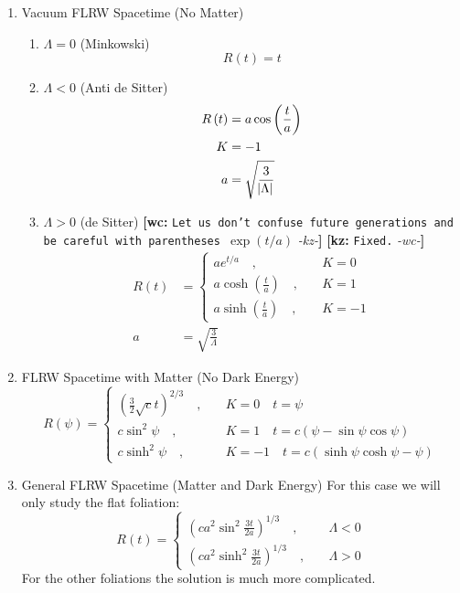 \documentclass[preprint,notitlepage,amsmath,amssymb,floatfix]{revtex4-1}
\newcommand{\XXX}[3]{{\bf [#1: } {\tt #3} {\it -#2-}{\bf ]}}
\begin{document}
\begin{enumerate}
  \item Vacuum FLRW Spacetime (No Matter)
  \begin{enumerate}
    \item $\Lambda = 0$ (Minkowski)
    \begin{equation}
    R\left(t\right) = t
    \end{equation}
    \item $\Lambda < 0$ (Anti de Sitter)
    \begin{equation}
    \begin{split}
    R\left(t\right) &= a\cos\left(\frac{t}{a}\right) \\
    K &= -1 \\
    a &= \sqrt{\frac{3}{\abs{\Lambda}}}
    \end{split}
    \end{equation}
    \item $\Lambda > 0$ (de Sitter) \XXX{wc}{kz}{Let us don't confuse future generations and be careful with parentheses $\exp{(t/a)}$} \XXX{kz}{wc}{Fixed.}
    \begin{equation}
    \begin{split}
    R\left(t\right) &= 
    \begin{cases}
      ae^{t/a}\quad,  & \quad K = 0 \\
      a\cosh\left(\frac{t}{a}\right)\quad, & \quad K = 1 \\
      a\sinh\left(\frac{t}{a}\right)\quad, & \quad K = -1
    \end{cases} \\
    a &= \sqrt{\frac{3}{\Lambda}}
    \end{split}
    \end{equation}
  \end{enumerate}

  \item FLRW Spacetime with Matter (No Dark Energy)
  \begin{equation}
  R\left(\psi\right) = 
  \begin{cases}
    \left(\frac{3}{2}\sqrt{c}t\right)^{2/3}\quad, & \quad K = 0 \quad t = \psi \\
    c\sin^2\psi\quad, & \quad K = 1 \quad t = c\left(\psi - \sin\psi\cos\psi\right) \\
    c\sinh^2\psi\quad, & \quad K = -1 \quad t = c\left(\sinh\psi\cosh\psi - \psi\right)
  \end{cases}
  \end{equation}

  \item General FLRW Spacetime (Matter and Dark Energy)
  For this case we will only study the flat foliation:
  \begin{equation}
  R\left(t\right) = 
  \begin{cases}
    \left(c a^2\sin^2\frac{3t}{2a}\right)^{1/3}\quad, & \quad \Lambda < 0 \\
    \left(c a^2\sinh^2\frac{3t}{2a}\right)^{1/3}\quad, & \quad \Lambda > 0
  \end{cases}
  \end{equation}
  For the other foliations the solution is much more complicated.
\end{enumerate}
\end{document}

